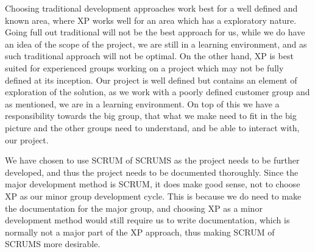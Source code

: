 Choosing traditional development approaches work best for a well defined and known area, where XP works well for an area which has a exploratory nature. Going full out traditional will not be the best approach for us, while we do have an idea of the scope of the project, we are still in a learning environment, and as such traditional approach will not be optimal. On the other hand, XP is best suited for experienced groups working on a project which may not be fully defined at its inception. Our project is well defined but contains an element of exploration of the solution, as we work with a poorly defined customer group and as mentioned, we are in a learning environment. On top of this we have a responsibility towards the big group, that what we make need to fit in the big picture and the other groups need to understand, and be able to interact with, our project. 

We have chosen to use SCRUM of SCRUMS as the project needs to be further developed, and thus the project needs to be documented thoroughly. Since the major development method is SCRUM, it does make good sense, not to choose XP as our minor group development cycle. This is because we do need to make the documentation for the major group, and choosing XP as a minor development method would still require us to write documentation, which is normally not a major part of the XP approach, thus making SCRUM of SCRUMS more desirable.